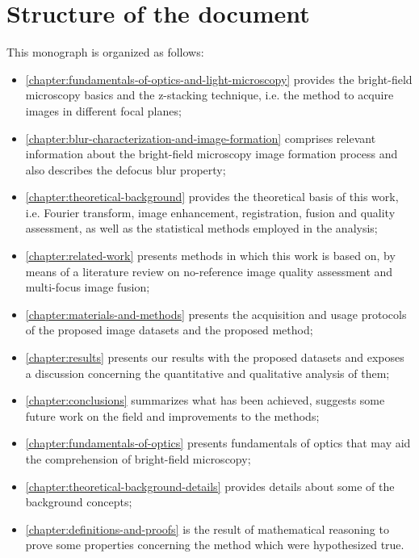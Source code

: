 \section*{Structure of the document}

This monograph is organized as follows:

\begin{itemize}
    \item \autoref{chapter:fundamentals-of-optics-and-light-microscopy} provides the bright-field microscopy basics and the z-stacking technique, i.e. the method to acquire images in different focal planes;
    
    \item \autoref{chapter:blur-characterization-and-image-formation} comprises relevant information about the bright-field microscopy image formation process and also describes the defocus blur property;
    
    \item \autoref{chapter:theoretical-background} provides the theoretical basis of this work, i.e. Fourier transform, image enhancement, registration, fusion and quality assessment, as well as the statistical methods employed in the analysis;
    
    \item \autoref{chapter:related-work} presents methods in which this work is based on, by means of a literature review on no-reference image quality assessment and multi-focus image fusion;
    
    \item \autoref{chapter:materials-and-methods} presents the acquisition and usage protocols of the proposed image datasets and the proposed method;
    
    \item \autoref{chapter:results} presents our results with the proposed datasets and exposes a discussion concerning the quantitative and qualitative analysis of them;
    
    \item \autoref{chapter:conclusions} summarizes what has been achieved, suggests some future work on the field and improvements to the methods;
    
    \item
    \autoref{chapter:fundamentals-of-optics} presents fundamentals of optics that may aid the comprehension of bright-field microscopy;
    
    \item
    \autoref{chapter:theoretical-background-details} provides details about some of the background concepts;
    
    \item \autoref{chapter:definitions-and-proofs} is the result of mathematical reasoning to prove some properties concerning the method which were hypothesized true.
    
\end{itemize}